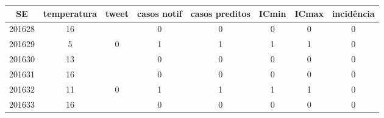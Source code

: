 \begin{tabular}{c|ccccccc}
  \hline
SE & temperatura & tweet & casos notif & casos preditos & ICmin & ICmax & incidência \\ 
  \hline
201628 & 16 &  & 0 & 0 & 0 & 0 & 0 \\ 
  201629 & 5 & 0 & 1 & 1 & 1 & 1 & 0 \\ 
  201630 & 13 &  & 0 & 0 & 0 & 0 & 0 \\ 
  201631 & 16 &  & 0 & 0 & 0 & 0 & 0 \\ 
  201632 & 11 & 0 & 1 & 1 & 1 & 1 & 0 \\ 
  201633 & 16 &  & 0 & 0 & 0 & 0 & 0 \\ 
   \hline
\end{tabular}
